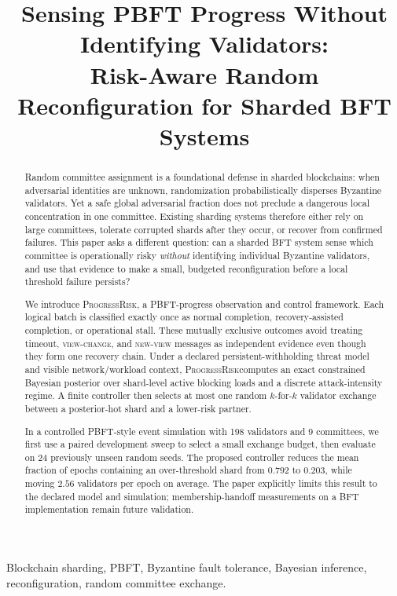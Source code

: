 \documentclass[10pt,conference]{IEEEtran}
\title{Sensing PBFT Progress Without Identifying Validators:\\
Risk-Aware Random Reconfiguration for Sharded BFT Systems}
\author{\IEEEauthorblockN{Anonymous Authors}
\IEEEauthorblockA{Working manuscript --- author names omitted}}
\newcommand{\sysname}{\textsc{ProgressRisk}}
\begin{document}
\maketitle

\begin{abstract}
Random committee assignment is a foundational defense in sharded blockchains: when adversarial identities are unknown, randomization probabilistically disperses Byzantine validators. Yet a safe global adversarial fraction does not preclude a dangerous local concentration in one committee. Existing sharding systems therefore either rely on large committees, tolerate corrupted shards after they occur, or recover from confirmed failures. This paper asks a different question: can a sharded BFT system sense which committee is operationally risky \emph{without} identifying individual Byzantine validators, and use that evidence to make a small, budgeted reconfiguration before a local threshold failure persists?

We introduce \sysname, a PBFT-progress observation and control framework. Each logical batch is classified exactly once as normal completion, recovery-assisted completion, or operational stall. These mutually exclusive outcomes avoid treating timeout, \textsc{view-change}, and \textsc{new-view} messages as independent evidence even though they form one recovery chain. Under a declared persistent-withholding threat model and visible network/workload context, \sysname computes an exact constrained Bayesian posterior over shard-level active blocking loads and a discrete attack-intensity regime. A finite controller then selects at most one random $k$-for-$k$ validator exchange between a posterior-hot shard and a lower-risk partner.

In a controlled PBFT-style event simulation with 198 validators and 9 committees, we first use a paired development sweep to select a small exchange budget, then evaluate on 24 previously unseen random seeds. The proposed controller reduces the mean fraction of epochs containing an over-threshold shard from $0.792$ to $0.203$, while moving $2.56$ validators per epoch on average. The paper explicitly limits this result to the declared model and simulation; membership-handoff measurements on a BFT implementation remain future validation.
\end{abstract}

\begin{IEEEkeywords}
Blockchain sharding, PBFT, Byzantine fault tolerance, Bayesian inference, reconfiguration, random committee exchange.
\end{IEEEkeywords}
\end{document}
